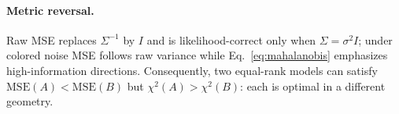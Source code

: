 \paragraph{Metric reversal.}
Raw MSE replaces $\Sigma^{-1}$ by $I$ and is likelihood-correct only when $\Sigma=\sigma^2I$; under colored noise MSE follows raw variance while Eq.~\eqref{eq:mahalanobis} emphasizes high-information directions. Consequently, two equal-rank models can satisfy $\mathrm{MSE}(A)<\mathrm{MSE}(B)$ but $\chi^2(A)>\chi^2(B)$: each is optimal in a different geometry.
